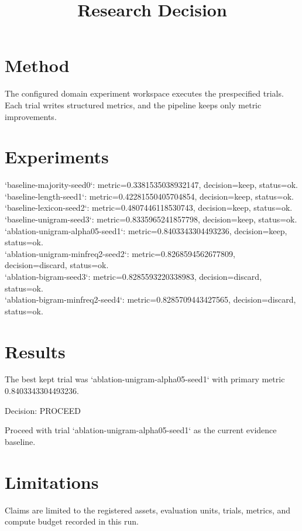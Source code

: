 \documentclass{article}
\begin{document}
\section{Method}
The configured domain experiment workspace executes the prespecified trials.
Each trial writes structured metrics, and the pipeline keeps only metric improvements.

\section{Experiments}
\noindent `baseline-majority-seed0`: metric=0.3381535038932147, decision=keep, status=ok.\\
\noindent `baseline-length-seed1`: metric=0.42281550405704854, decision=keep, status=ok.\\
\noindent `baseline-lexicon-seed2`: metric=0.4807446118530743, decision=keep, status=ok.\\
\noindent `baseline-unigram-seed3`: metric=0.8335965241857798, decision=keep, status=ok.\\
\noindent `ablation-unigram-alpha05-seed1`: metric=0.8403343304493236, decision=keep, status=ok.\\
\noindent `ablation-unigram-minfreq2-seed2`: metric=0.8268594562677809, decision=discard, status=ok.\\
\noindent `ablation-bigram-seed3`: metric=0.8285593220338983, decision=discard, status=ok.\\
\noindent `ablation-bigram-minfreq2-seed4`: metric=0.8285709443427565, decision=discard, status=ok.\\

\section{Results}
The best kept trial was `ablation-unigram-alpha05-seed1` with primary metric 0.8403343304493236.
\title{Research Decision}
\maketitle

Decision: PROCEED

Proceed with trial `ablation-unigram-alpha05-seed1` as the current evidence baseline.

\section{Limitations}
Claims are limited to the registered assets, evaluation units, trials, metrics, and compute budget recorded in this run.
\end{document}
